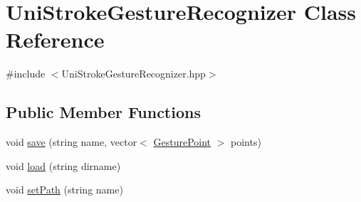 \hypertarget{class_uni_stroke_gesture_recognizer}{\section{\-Uni\-Stroke\-Gesture\-Recognizer \-Class \-Reference}
\label{class_uni_stroke_gesture_recognizer}
}


{\ttfamily \#include $<$\-Uni\-Stroke\-Gesture\-Recognizer.\-hpp$>$}

\subsection*{\-Public \-Member \-Functions}
\begin{DoxyCompactItemize}
\item 
void \hyperlink{class_uni_stroke_gesture_recognizer_a17a223c7cfb8908655f099806b6ec0df}{save} (string name, vector$<$ \hyperlink{class_gesture_point}{\-Gesture\-Point} $>$ points)
\item 
void \hyperlink{class_uni_stroke_gesture_recognizer_afbcfca0ce5ed755d19e2712e535795d3}{load} (string dirname)
\item 
void \hyperlink{class_uni_stroke_gesture_recognizer_a826b32deaa2eae9a81cda3ed29de05de}{set\-Path} (string name)
\end{DoxyCompactItemize}


